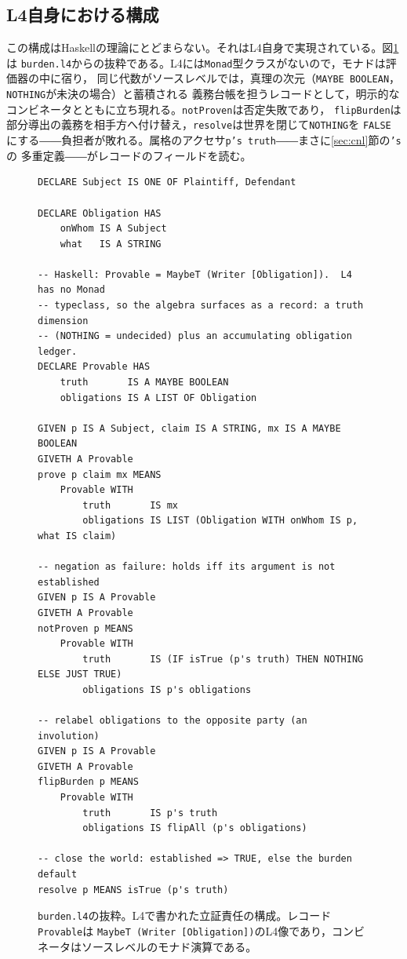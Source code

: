 \documentclass[11pt,a4paper]{ltjsarticle}
\newcommand{\code}[1]{\texttt{\small #1}}
\begin{document}
\subsection{L4自身における構成}\label{app:burdenl4}
この構成はHaskellの理論にとどまらない。それはL4自身で実現されている。図\ref{fig:burdenl4}は
\code{burden.l4}からの抜粋である。L4には\code{Monad}型クラスがないので，モナドは評価器の中に宿り，
同じ代数がソースレベルでは，真理の次元（\code{MAYBE BOOLEAN}，\code{NOTHING}が未決の場合）と蓄積される
義務台帳を担うレコードとして，明示的なコンビネータとともに立ち現れる。\code{notProven}は否定失敗であり，
\code{flipBurden}は部分導出の義務を相手方へ付け替え，\code{resolve}は世界を閉じて\code{NOTHING}を
\code{FALSE}にする――負担者が敗れる。属格のアクセサ\code{p's truth}――まさに\ref{sec:cnl}節の\code{'s}の
多重定義――がレコードのフィールドを読む。

\begin{figure}[t]
\begin{lstlisting}
DECLARE Subject IS ONE OF Plaintiff, Defendant

DECLARE Obligation HAS
    onWhom IS A Subject
    what   IS A STRING

-- Haskell: Provable = MaybeT (Writer [Obligation]).  L4 has no Monad
-- typeclass, so the algebra surfaces as a record: a truth dimension
-- (NOTHING = undecided) plus an accumulating obligation ledger.
DECLARE Provable HAS
    truth       IS A MAYBE BOOLEAN
    obligations IS A LIST OF Obligation

GIVEN p IS A Subject, claim IS A STRING, mx IS A MAYBE BOOLEAN
GIVETH A Provable
prove p claim mx MEANS
    Provable WITH
        truth       IS mx
        obligations IS LIST (Obligation WITH onWhom IS p, what IS claim)

-- negation as failure: holds iff its argument is not established
GIVEN p IS A Provable
GIVETH A Provable
notProven p MEANS
    Provable WITH
        truth       IS (IF isTrue (p's truth) THEN NOTHING ELSE JUST TRUE)
        obligations IS p's obligations

-- relabel obligations to the opposite party (an involution)
GIVEN p IS A Provable
GIVETH A Provable
flipBurden p MEANS
    Provable WITH
        truth       IS p's truth
        obligations IS flipAll (p's obligations)

-- close the world: established => TRUE, else the burden default
resolve p MEANS isTrue (p's truth)
\end{lstlisting}
\caption{\code{burden.l4}の抜粋。L4で書かれた立証責任の構成。レコード\code{Provable}は
\code{MaybeT (Writer [Obligation])}のL4像であり，コンビネータはソースレベルのモナド演算である。}
\label{fig:burdenl4}
\end{figure}
\end{document}
